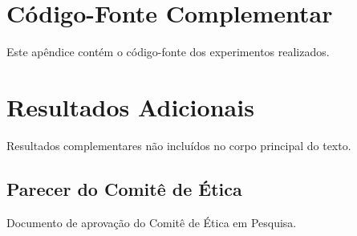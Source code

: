 \documentclass[
    12pt,                   %
    a4paper,                %
    openright,              %
    oneside,                %
    english,                %
    brazil                  %
]{abntex2}
\theoremstyle{plain}
\theoremstyle{definition}
\theoremstyle{remark}
\begin{document}
\begin{apendicesenv}
    \chapter{C\'odigo-Fonte Complementar}
    \label{ap:codigo}

    Este ap\^endice cont\'em o c\'odigo-fonte dos
    experimentos realizados.

    \chapter{Resultados Adicionais}
    \label{ap:res_adicionais}

    Resultados complementares n\~ao inclu\'idos no corpo
    principal do texto.
\end{apendicesenv}

\begin{anexosenv}
    \chapter{Parecer do Comit\^e de \'Etica}
    \label{an:etica}

    Documento de aprova\c{c}\~ao do Comit\^e de
    \'Etica em Pesquisa.
\end{anexosenv}

\printindex
\end{document}
